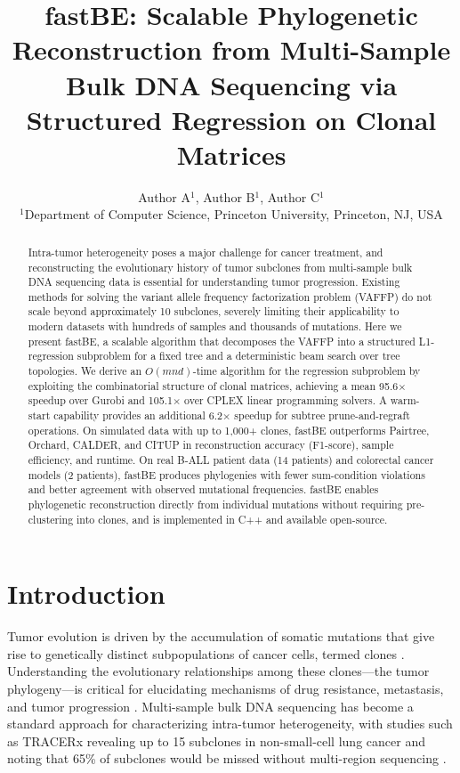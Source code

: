 \documentclass[11pt]{article}
\title{fastBE: Scalable Phylogenetic Reconstruction from Multi-Sample Bulk DNA Sequencing via Structured Regression on Clonal Matrices}
\author{Author A$^{1}$, Author B$^{1}$, Author C$^{1}$ \\
\small $^{1}$Department of Computer Science, Princeton University, Princeton, NJ, USA}
\date{}
\begin{document}
\maketitle

\begin{abstract}
Intra-tumor heterogeneity poses a major challenge for cancer treatment, and reconstructing the evolutionary history of tumor subclones from multi-sample bulk DNA sequencing data is essential for understanding tumor progression. Existing methods for solving the variant allele frequency factorization problem (VAFFP) do not scale beyond approximately 10 subclones, severely limiting their applicability to modern datasets with hundreds of samples and thousands of mutations. Here we present fastBE, a scalable algorithm that decomposes the VAFFP into a structured L1-regression subproblem for a fixed tree and a deterministic beam search over tree topologies. We derive an $O(mnd)$-time algorithm for the regression subproblem by exploiting the combinatorial structure of clonal matrices, achieving a mean 95.6$\times$ speedup over Gurobi and 105.1$\times$ over CPLEX linear programming solvers. A warm-start capability provides an additional 6.2$\times$ speedup for subtree prune-and-regraft operations. On simulated data with up to 1,000+ clones, fastBE outperforms Pairtree, Orchard, CALDER, and CITUP in reconstruction accuracy (F1-score), sample efficiency, and runtime. On real B-ALL patient data (14 patients) and colorectal cancer models (2 patients), fastBE produces phylogenies with fewer sum-condition violations and better agreement with observed mutational frequencies. fastBE enables phylogenetic reconstruction directly from individual mutations without requiring pre-clustering into clones, and is implemented in C++ and available open-source.
\end{abstract}

\section{Introduction}

Tumor evolution is driven by the accumulation of somatic mutations that give rise to genetically distinct subpopulations of cancer cells, termed clones \citep{nowell1976clonal, greaves2012clonal}. Understanding the evolutionary relationships among these clones---the tumor phylogeny---is critical for elucidating mechanisms of drug resistance, metastasis, and tumor progression \citep{mcgranahan2017clonal}. Multi-sample bulk DNA sequencing has become a standard approach for characterizing intra-tumor heterogeneity, with studies such as TRACERx revealing up to 15 subclones in non-small-cell lung cancer and noting that 65\% of subclones would be missed without multi-region sequencing \citep{jamal2017tracking}.
\end{document}
